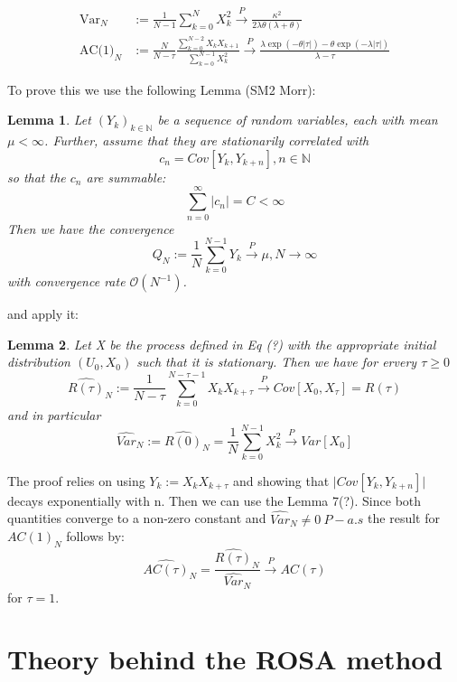 \documentclass[%
thesis=student,%
coverpage=false,%
titlepage=false,%
headmarks=true, %
german,%
font=libertine, %
math=newpxtx, %
BCOR=5mm,%
coverBCOR=11mm%
]{tumbook}
\newtheorem{lemma}{Lemma}
\begin{document}
\begin{subequations}
        \begin{align*}
            \text{Var}_{N} &:= \frac{1}{N-1}\sum_{k=0}^{N}X_{k}^{2} \xrightarrow{P} \frac{\kappa^{2}}{2\lambda\theta(\lambda + \theta)} \\
            \text{AC(1)}_{N} &:= \frac{N}{N-\tau}\frac{\sum_{k=0}^{N-2}X_{k}X_{k+1}}{\sum_{k=0}^{N-1}X_{k}^{2}} \xrightarrow{P} \frac{\lambda\exp(-\theta\lvert\tau\rvert) - \theta\exp(-\lambda\lvert\tau\rvert)}{\lambda - \tau}
        \end{align*}
\end{subequations}

To prove this we use the following Lemma (SM2 Morr):

\begin{lemma}
    Let $(Y_{k})_{k\in \mathbb{N}}$ be a sequence of random variables, each with mean $\mu < \infty$. Further, assume that they are stationarily correlated with
    \[
    c_{n} = Cov[Y_{k},Y_{k+n}], n \in \mathbb{N}
    \]
    so that the $c_{n}$ are summable:
    \[
    \sum_{n=0}^{\infty}\lvert c_{n} \rvert = C < \infty
    \]
    Then we have the convergence
    \[
    Q_{N} := \frac{1}{N}\sum_{k=0}^{N-1}Y_{k} \xrightarrow{P} \mu, N \rightarrow \infty
    \]
    with convergence rate $\mathcal{O}(N^{-1})$.
\end{lemma}

and apply it:

\begin{lemma}
    Let X be the process defined in Eq (?) with the appropriate initial distribution $(U_{0},X_{0})$ such that it is stationary. Then we have for ervery $\tau \geq 0$
    \[
    \hat{R(\tau)}_{N} := \frac{1}{N-\tau} \sum_{k=0}^{N-\tau -1} X_{k}X_{k+\tau} \xrightarrow{P} Cov[X_{0},X_{\tau}] = R(\tau)
    \]
    and in particular
    \[
    \hat{Var}_{N} := \hat{R(0)}_{N} = \frac{1}{N} \sum_{k=0}^{N-1} X_{k}^{2} \xrightarrow{P}Var[X_{0}]
    \]
\end{lemma}

The proof relies on using $Y_{k} := X_{k}X_{k+\tau}$ and showing that $\lvert Cov[Y_{k},Y_{k+n}] \rvert$ decays exponentially with n. Then we can use the Lemma 7(?). Since both quantities converge to a non-zero constant and $\hat{Var}_N \neq 0 \ P-a.s$ the result for $AC(1)_{N}$ follows by:
\[
\hat{AC(\tau)}_N = \frac{\hat{R(\tau)}_{N}}{\hat{Var}_{N}} \xrightarrow{P} AC(\tau)
\]
for $\tau = 1$.



\chapter{Theory behind the ROSA method}
\end{document}
